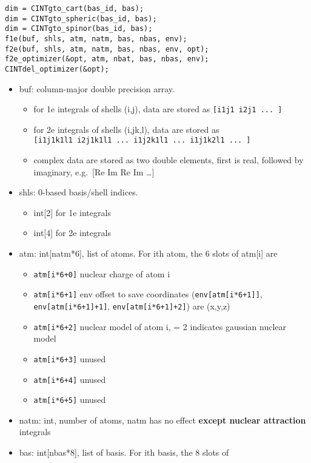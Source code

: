 \documentclass{article}
\begin{document}
\begin{verbatim}
dim = CINTgto_cart(bas_id, bas);
dim = CINTgto_spheric(bas_id, bas);
dim = CINTgto_spinor(bas_id, bas);
f1e(buf, shls, atm, natm, bas, nbas, env);
f2e(buf, shls, atm, natm, bas, nbas, env, opt);
f2e_optimizer(&opt, atm, nbat, bas, nbas, env);
CINTdel_optimizer(&opt);
\end{verbatim}
\begin{itemize}
\item
  buf: column-major double precision array.
  \begin{itemize}
  \item
    for 1e integrals of shells (i,j), data are stored as
    \verb![i1j1 i2j1 ... ]!
  \item
    for 2e integrals of shells (i,j\textbar{}k,l), data are stored as\\
    \verb![i1j1k1l1 i2j1k1l1 ... i1j2k1l1 ... i1j1k2l1 ... ]!
  \item
    complex data are stored as two double elements, first is real,
    followed by imaginary, e.g.~[Re Im Re Im \ldots{}]
  \end{itemize}
\item
  shls: 0-based basis/shell indices.
  \begin{itemize}
  \item
    int[2] for 1e integrals
  \item
    int[4] for 2e integrals
  \end{itemize}
\item
  atm: int[natm*6], list of atoms. For ith atom, the 6 slots of
  atm[i] are
  \begin{itemize}
  \item
    \verb!atm[i*6+0]! nuclear charge of atom i
  \item
    \verb!atm[i*6+1]! env offset to save coordinates
    (\verb!env[atm[i*6+1]]!, \verb!env[atm[i*6+1]+1]!,
    \verb!env[atm[i*6+1]+2]!) are (x,y,z)
  \item
    \verb!atm[i*6+2]! nuclear model of atom i, = 2 indicates gaussian
    nuclear model
  \item
    \verb!atm[i*6+3]! unused
  \item
    \verb!atm[i*6+4]! unused
  \item
    \verb!atm[i*6+5]! unused
  \end{itemize}
\item
  natm: int, number of atoms, natm has no effect
  \textbf{except nuclear attraction} integrals
\item
  bas: int[nbas*8], list of basis. For ith basis, the 8 slots of

\end{itemize}
\end{document}
